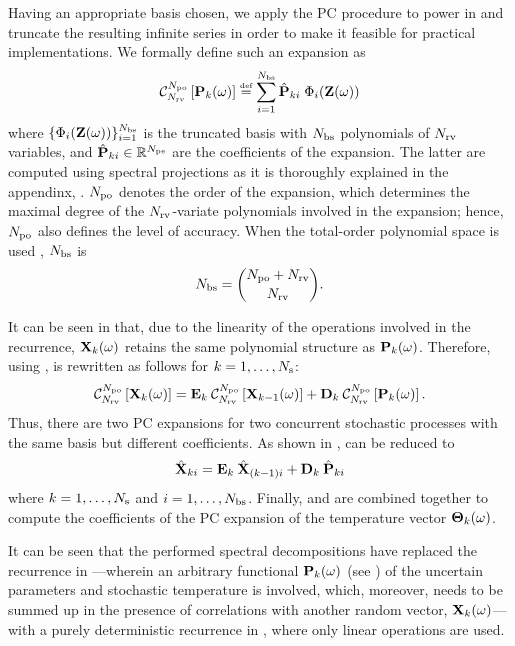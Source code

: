 Having an appropriate basis chosen, we apply the PC procedure to power in  and truncate the resulting infinite series in order to make it feasible for practical implementations. We formally define such an expansion as
\begin{equation} \elabel{pc-expansion}
  \oPC{\vars}{\pcorder}{\vP_k(\o)} \eqdef \sum_{i = 1}^{\pcterms} \pcc{\vP}_{ki} \; \pcb_i(\vZ(\o))
\end{equation}
where $\{ \Phi_i(\mathbf{Z}(\omega)) \}_{i = 1}^{{N_\text{bs}}}$ is the truncated basis with ${N_\text{bs}}$ polynomials of ${N_\text{rv}}$ variables, and $\hat{\mathbf{P}}_{ki} \in \mathbb{R}^{N_\text{pe}}$ are the coefficients of the expansion. The latter are computed using spectral projections as it is thoroughly explained in the appendinx, . ${N_\text{po}}$ denotes the order of the expansion, which determines the maximal degree of the ${N_\text{rv}}$-variate polynomials involved in the expansion; hence, ${N_\text{po}}$ also defines the level of accuracy. When the total-order polynomial space is used \cite{beck2011}, ${N_\text{bs}}$ is
\begin{equation} \elabel{pc-terms}
  \pcterms = { \pcorder + \vars \choose \vars }.
\end{equation}

It can be seen in  that, due to the linearity of the operations involved in the recurrence, $\mathbf{X}_k(\omega)$ retains the same polynomial structure as $\mathbf{P}_k(\omega)$. Therefore, using ,  is rewritten as follows for $k = 1, \dotsc, N_\text{s}$:
\begin{equation} \elabel{expanded-recurrence}
  \oPC{\vars}{\pcorder}{\vX_k(\o)} = \mE_k \: \oPC{\vars}{\pcorder}{\vX_{k-1}(\o)} + \mD_k \: \oPC{\vars}{\pcorder}{\vP_k(\o)}.
\end{equation}
Thus, there are two PC expansions for two concurrent stochastic processes with the same basis but different coefficients. As shown in ,  can be reduced to
\begin{equation} \elabel{pc-recurrence}
  \pcc{\vX}_{ki} = \mE_k \: \pcc{\vX}_{(k - 1)i} + \mD_k \: \pcc{\vP}_{ki}
\end{equation}
where $k = 1, \dotsc, N_\text{s}$ and $i = 1, \dotsc, {N_\text{bs}}$. Finally,  and  are combined together to compute the coefficients of the PC expansion of the temperature vector ${\boldsymbol\Theta}_k(\omega)$.

It can be seen that the performed spectral decompositions have replaced the recurrence in ---wherein an arbitrary functional $\mathbf{P}_k(\omega)$ (see ) of the uncertain parameters and stochastic temperature is involved, which, moreover, needs to be summed up in the presence of correlations with another random vector, $\mathbf{X}_k(\omega)$---with a purely deterministic recurrence in , where only linear operations are used.
